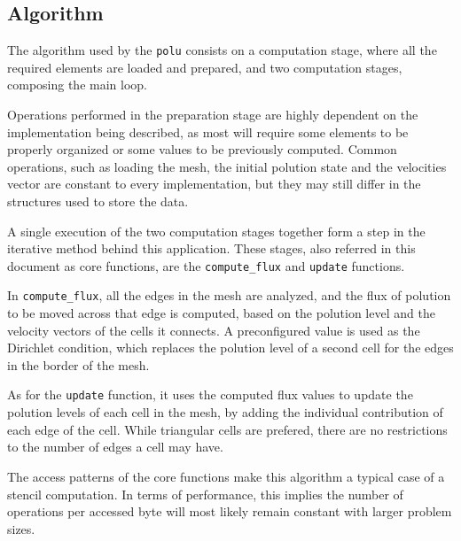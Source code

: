 \subsection{Algorithm}


The algorithm used by the \texttt{polu} consists on a computation stage, where all the required elements are loaded and prepared, and two computation stages, composing the main loop.

Operations performed in the preparation stage are highly dependent on the implementation being described, as most will require some elements to be properly organized or some values to be previously computed. Common operations, such as loading the mesh, the initial polution state and the velocities vector are constant to every implementation, but they may still differ in the structures used to store the data.

A single execution of the two computation stages together form a step in the iterative method behind this application. These stages, also referred in this document as core functions, are the \texttt{compute\_flux} and \texttt{update} functions.

In \texttt{compute\_flux}, all the edges in the mesh are analyzed, and the flux of polution to be moved across that edge is computed, based on the polution level and the velocity vectors of the cells it connects. A preconfigured value is used as the Dirichlet condition, which replaces the polution level of a second cell for the edges in the border of the mesh.

As for the \texttt{update} function, it uses the computed flux values to update the polution levels of each cell in the mesh, by adding the individual contribution of each edge of the cell. While triangular cells are prefered, there are no restrictions to the number of edges a cell may have.

The access patterns of the core functions make this algorithm a typical case of a stencil computation. In terms of performance, this implies the number of operations per accessed byte will most likely remain constant with larger problem sizes.
